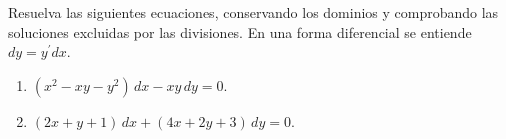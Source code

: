 Resuelva las siguientes ecuaciones, conservando los dominios y comprobando las soluciones excluidas por las divisiones. En una forma diferencial se entiende $dy=y^{\prime}dx$.

\begin{enumerate}[label=(\alph*),ref=\alph*,leftmargin=*]
\item $(x^2-xy-y^2)\,dx-xy\,dy=0$.
\item $(2x+y+1)\,dx+(4x+2y+3)\,dy=0$.
\end{enumerate}
